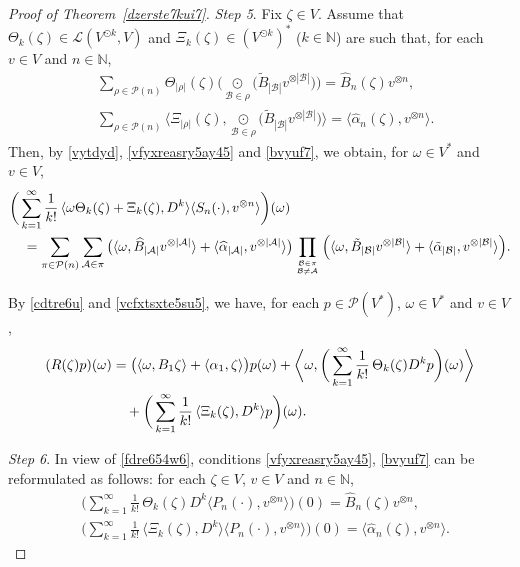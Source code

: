 \documentclass[10pt,a4paper]{amsart}
\begin{document}
\begin{proof}[Proof of Theorem~\ref{dzerste7kui7}]
 {\it Step 5}. Fix $\zeta\in V$. Assume that $\Theta_k(\zeta)\in \mathcal L(V^{\odot k},V)$ and $\Xi_k(\zeta)\in(V^{\odot k})^*$
($k\in\mathbb N$) are 
 such that, for each  $v\in V$ and $n\in\mathbb N$,
\begin{align}
&\sum_{\rho\in\mathcal P(n)}  \Theta_{|\rho|}(\zeta)\bigg(\underset{\mathcal B\in\rho}{\odot}\big(\tilde B_{|\mathcal B|}v^{\otimes |\mathcal B|}\big)\bigg)=\widehat B_{n}(\zeta)v^{\otimes n} ,\label{vfyxreasry5ay45}\\
&\sum_{\rho\in\mathcal P(n)} \Big\langle \Xi_{|\rho|}(\zeta), \underset{\mathcal B\in\rho}{\odot}\big(\tilde B_{|\mathcal B|}v^{\otimes |\mathcal B|}\big)\Big\rangle =\langle \widehat\alpha_{n}(\zeta),v^{\otimes n}\big\rangle.
\label{bvyuf7}\end{align}
Then, by \eqref{vytdyd}, \eqref{vfyxreasry5ay45} and \eqref{bvyuf7}, we obtain, for $\omega\in V^*$ and $v\in V$,
\begin{align}
&\bigg(\sum_{k=1}^\infty \frac 1{k!}\,\langle \omega \Theta_k(\zeta)+\Xi_k(\zeta), D^{k}\rangle
\langle S_n(\cdot),v^{\otimes n}\rangle\bigg)(\omega)\notag\\ 
&\quad=\sum_{\pi\in\mathcal P(n)}\sum_{\mathcal A\in\pi}
\big(\langle\omega,\widehat B_{|\mathcal A|}v^{\otimes|\mathcal A|}\rangle+\langle\widehat \alpha_{|\mathcal A|},v^{\otimes |\mathcal A|}\rangle \big)
\prod_{{\mathcal B\in\pi}\atop{\mathcal B\ne\mathcal A}}\Big(\langle\omega,\tilde B_{|\mathcal B|}v^{\otimes|\mathcal B|} \rangle+\langle\tilde\alpha_{|\mathcal B|},
v^{\otimes|\mathcal B|}\rangle\Big).\label{vcfxtsxte5su5}
\end{align}

By \eqref{cdtre6u} and \eqref{vcfxtsxte5su5}, we have, for each $p\in\mathcal P(V^*)$, $\omega\in V^*$ and $v\in V$,
\begin{align}
(R(\zeta)p)(\omega)&=\big(\langle\omega, B_1\zeta\rangle+\langle \alpha_1,\zeta\rangle\big)p(\omega)+\bigg\langle\omega, \bigg(\sum_{k=1}^\infty \frac 1{k!}\,\Theta_k(\zeta)D^kp\bigg)(\omega)\bigg\rangle\notag\\
&\quad+\bigg(\sum_{k=1}^\infty \frac 1{k!}\,\langle \Xi_k(\zeta), D^k\rangle p\bigg)(\omega).\label{vgdctrs5ea43y7}
\end{align}


{\it Step 6}. In view of \eqref{fdre654w6}, conditions \eqref{vfyxreasry5ay45},  \eqref{bvyuf7}   can be reformulated as follows: for each 
$\zeta\in V$, $v\in V$ and $n\in\mathbb N$, 
\begin{align}
&\bigg(\sum_{k=1}^\infty \frac 1{k!}\,\Theta_k(\zeta) D^{k} \langle P_n(\cdot),v^{\otimes n}\rangle\bigg)(0)=
\widehat B_{n}(\zeta)v^{\otimes n},\label{vdrste5s5sw5}\\
&\bigg(\sum_{k=1}^\infty \frac 1{k!}\,\langle \Xi_k(\zeta), D^{k} \rangle\langle P_n(\cdot),v^{\otimes n}\rangle\bigg)(0)=\langle \widehat\alpha_{n}(\zeta),v^{\otimes n}\rangle.
\label{dzrwaw}\end{align}



\end{proof}
\end{document}
